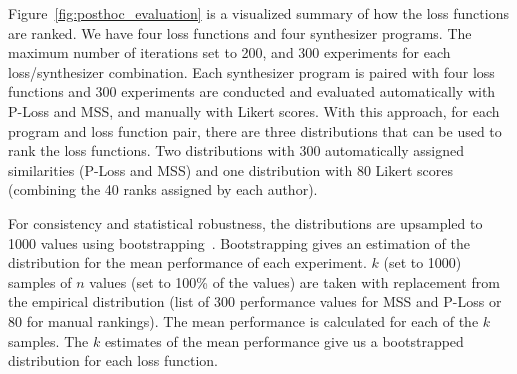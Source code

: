  
 Figure~\ref{fig:posthoc_evaluation} is a visualized summary of how the loss functions are ranked. We have four loss functions and four synthesizer programs. The maximum number of iterations set to 200, and 300 experiments for each loss/synthesizer combination. Each synthesizer program is paired with four loss functions and 300 experiments are conducted and evaluated automatically with P-Loss and MSS, and manually with Likert scores. With this approach, for each program and loss function pair, there are three distributions that can be used to rank the loss functions. Two distributions with 300 automatically assigned similarities (P-Loss and MSS) and one distribution with 80 Likert scores (combining the 40 ranks assigned by each author).

For consistency and statistical robustness, the distributions are upsampled to 1000 values using bootstrapping~\cite{tibshirani1993introduction}. Bootstrapping gives an estimation of the distribution for the mean performance of each experiment. $k$ (set to 1000) samples of $n$ values (set to 100\% of the values) are taken with replacement from the empirical distribution (list of 300 performance values for MSS and P-Loss or 80 for manual rankings). The mean performance is calculated for each of the $k$ samples. The $k$ estimates of the mean performance give us a bootstrapped distribution for each loss function. 


